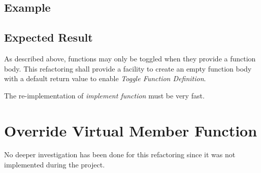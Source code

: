 \subsection*{Example}


\subsection{Expected Result}
As described above, functions may only be toggled when they provide a function 
body. This refactoring shall provide a facility to create an empty function body 
with a default return value to enable \textit{Toggle Function Definition}.

The re-implementation of \textit{implement function} must be very fast. 

\section{Override Virtual Member Function}

No deeper investigation has been done for this refactoring since it was not 
implemented during the project.